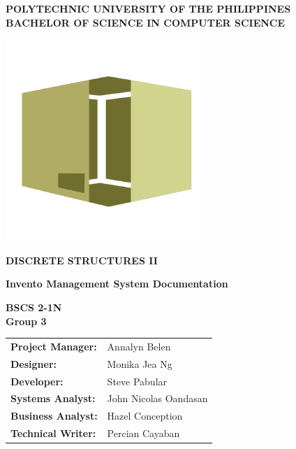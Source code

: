 \documentclass[12pt,a4paper]{article}
\begin{document}
    \thispagestyle{empty}

    \vspace*{\fill}
    \begingroup
    \centering

        \textbf{POLYTECHNIC UNIVERSITY OF THE PHILIPPINES\\
        BACHELOR OF SCIENCE IN COMPUTER SCIENCE}\vspace{.1in}

        \noindent\includegraphics[width=3in,height=3in]{logo.png}\vspace{.1in}

        \textbf{DISCRETE STRUCTURES II}\vspace{.1in}
        
        \textbf{\huge Invento Management System Documentation}\vspace{2in}

    \endgroup
    \vspace*{\fill}

        \noindent\textbf{BSCS 2-1N\\Group 3}\vspace{0.2in}

        \noindent
        \begin{tabular}{l l}
            \textbf{Project Manager:} & Annalyn Belen \\
            \textbf{Designer:} & Monika Jea Ng\\
            \textbf{Developer:} & Steve Pabular \\
            \textbf{Systems Analyst:} & John Nicolas Oandasan\\
            \textbf{Business Analyst:} & Hazel Conception\\
            \textbf{Technical Writer:} & Percian Cayaban
        \end{tabular}\vspace{0.2in}
\end{document}
